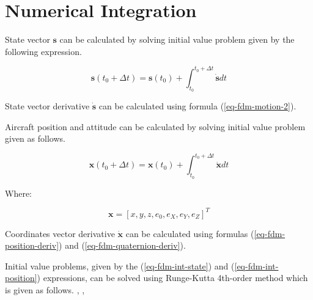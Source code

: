 \section{Numerical Integration}

State vector $\boldsymbol s$ can be calculated by solving initial value problem given by the following expression.

\begin{equation}
  \label{eq-fdm-int-state}
  {\boldsymbol s} \left( t_0 + \Delta t \right)
  =
  {\boldsymbol s} \left( t_0 \right)
  +
  \int_{t_0}^{t_0 + \Delta t} \dot {\boldsymbol s} dt
\end{equation}


State vector derivative $\dot {\boldsymbol s}$ can be calculated using formula (\ref{eq-fdm-motion-2}).

Aircraft position and attitude can be calculated by solving initial value problem given as follows.

\begin{equation}
  \label{eq-fdm-int-position}
  {\boldsymbol x} \left( t_0 + \Delta t \right)
  =
  {\boldsymbol x} \left( t_0 \right)
  +
  \int_{t_0}^{t_0 + \Delta t} \dot {\boldsymbol x} dt
\end{equation}

Where:

\begin{equation}
  {\boldsymbol x}
  =
  \left[
    x, y, z, e_0, e_X, e_Y, e_Z
  \right]^T
\end{equation}

Coordinates vector derivative $\dot {\boldsymbol x}$ can be calculated using formulas (\ref{eq-fdm-position-deriv}) and (\ref{eq-fdm-quaternion-deriv}).

Initial value problems, given by the (\ref{eq-fdm-int-state}) and (\ref{eq-fdm-int-position}) expressions, can be solved using Runge-Kutta 4th-order method which is given as follows. \cite{Press2007}, \cite{Krupowicz1986}, \cite{BaronPiatek2004}
